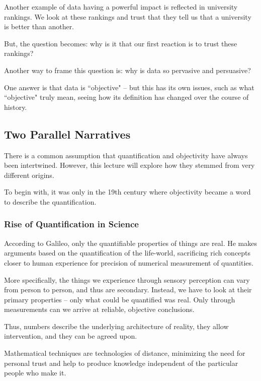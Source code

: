 \documentclass[openany]{book}
\begin{document}
\begin{example}
	Another example of data having a powerful impact is reflected in university rankings. We look at these rankings and trust that they tell us that a university is better than another.
\end{example}

But, the question becomes: why is it that our first reaction is to trust these rankings?

Another way to frame this question is: why is data so pervasive and persuasive?

One answer is that data is ``objective" -- but this has its own issues, such as what ``objective" truly mean, seeing how its definition has changed over the course of history.

\subsection{Two Parallel Narratives}
There is a common assumption that quantification and objectivity have always been intertwined. However, this lecture will explore how they stemmed from very different origins.

To begin with, it was only in the 19th century where objectivity became a word to describe the quantification.

\subsubsection{Rise of Quantification in Science}
According to Galileo, only the quantifiable properties of things are real. He makes arguments based on the quantification of the life-world, sacrificing rich concepts closer to human experience for precision of numerical measurement of quantities.

More specifically, the things we experience through sensory perception can vary from person to person, and thus are secondary. Instead, we have to look at their primary properties -- only what could be quantified was real. Only through measurements can we arrive at reliable, objective conclusions.

Thus, numbers describe the underlying architecture of reality, they allow intervention, and they can be agreed upon.

Mathematical techniques are technologies of distance, minimizing the need for personal trust and help to produce knowledge independent of the particular people who make it.
\end{document}
